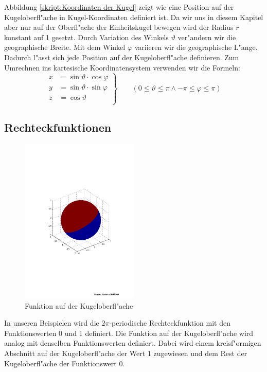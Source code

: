 \begin{refsection}
Abbildung \ref{skript:Koordinaten der Kugel} 
zeigt wie eine Position auf der Kugeloberfl"ache in
Kugel-Koordinaten definiert ist. 
Da wir uns in diesem Kapitel aber nur auf der Oberfl"ache der 
Einheitskugel bewegen wird der Radius $r$ konstant auf 1 gesetzt. 
Durch Variation des Winkels $\vartheta$ ver"andern wir die 
geographische Breite. 
Mit dem Winkel $\varphi$ variieren wir die geographische 
L"ange. 
Dadurch l"asst sich jede Position auf der Kugeloberfl"ache definieren. 
Zum Umrechnen ins kartesische Koordinatensystem verwenden wir die 
Formeln:
\[
\left.\begin{aligned}
x& = \sin\vartheta \cdot \cos\varphi\\
y& = \sin\vartheta \cdot \sin\varphi\\
z& = \cos\vartheta\\      
\end{aligned}
\right\}
\qquad (0 \leq \vartheta \leq \pi \wedge {-\pi} \leq \varphi \leq \pi)
\]

\subsection{Rechteckfunktionen}
\begin{figure}%
\centering
\includegraphics[width=0.5\textwidth]{kugel/Funktion.pdf}
\caption{Funktion auf der Kugeloberfl"ache
\label{skript:Funktion auf Kugeloberfl"ache}}
\end{figure}
In unseren Beispielen wird die $2\pi$-periodische Rechteckfunktion
mit den Funktionswerten 0 und 1 definiert. 
Die Funktion auf der Kugeloberfl"ache wird analog 
mit denselben Funktionswerten definiert. 
Dabei wird einem kreisf"ormigen Abschnitt auf der Kugeloberfl"ache 
der Wert 1 zugewiesen und dem Rest der Kugeloberfl"ache der 
Funktionswert 0. 


\end{refsection}
